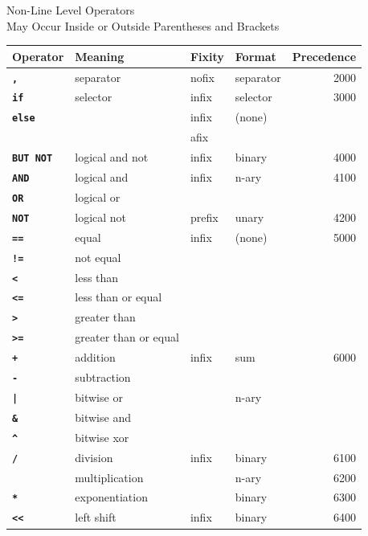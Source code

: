 \documentclass[12pt]{article}
\newcommand{\ttkey}[1]{{\tt \bfseries #1}}
\newlength{\figurewidth}
\newenvironment{boxedfigure}[1][!btp]%
	{\begin{figure*}[#1]
	 \begin{lrbox}{\figurebox}
	 \begin{minipage}{\figurewidth}

	 \vspace*{1ex}}%
	{
	 \vspace*{1ex}

	 \end{minipage}
	 \end{lrbox}

	 \centering
	 \fbox{\hspace*{0.1in}\usebox{\figurebox}\hspace*{0.1in}}
	 \end{figure*}}
\begin{document}
\begin{boxedfigure}[!t]
\begin{center}
Non-Line Level Operators \\
May Occur Inside or Outside Parentheses and Brackets
\\[1ex]
\begin{tabular}{|l|l|l|l|r|}
\hline
Operator & Meaning & Fixity & Format & Precedence \\
\hline
\ttkey{,} & separator & nofix & separator & 2000
\\\hline
\ttkey{if} & selector & infix & selector & 3000
\\\cline{1-1}\cline{3-4}
\ttkey{else} & & infix & (none) & \\
             & & afix & &
\\\hline
\ttkey{BUT NOT} & logical and not & infix & binary & 4000
\\\hline
\ttkey{AND} & logical and & infix & n-ary & 4100
\\\cline{1-2}
\ttkey{OR}  & logical or  & & &
\\\hline
\ttkey{NOT}  & logical not & prefix & unary & 4200
\\\hline
\ttkey{==}  & equal & infix & (none) & 5000
\\\cline{1-2}
\ttkey{!=}  & not equal & & &
\\\cline{1-2}
\ttkey{<}  & less than & & &
\\\cline{1-2}
\ttkey{<=}  & less than or equal & & &
\\\cline{1-2}
\ttkey{>}  & greater than & & &
\\\cline{1-2}
\ttkey{>=}  & greater than or equal & & &
\\\hline
\ttkey{+}  & addition & infix & sum & 6000
\\\cline{1-2}
\ttkey{-}  & subtraction & & &
\\\cline{1-2}\cline{4-4}
\ttkey{|}  & bitwise or & & n-ary &
\\\cline{1-2}
\ttkey{\&}  & bitwise and & & &
\\\cline{1-2}
\ttkey{\textasciicircum}  & bitwise xor & & &
\\\hline
\ttkey{/}  & division & infix & binary & 6100
\\\cline{1-2}\cline{4-5}
\ttkey{*}  & multiplication & & n-ary & 6200
\\\cline{1-2}\cline{4-5}
\ttkey{**}  & exponentiation & & binary & 6300
\\\hline
\ttkey{<{}<}  & left shift & infix & binary & 6400
\\\cline{1-2}

\end{tabular}
\end{center}
\end{boxedfigure}
\end{document}
